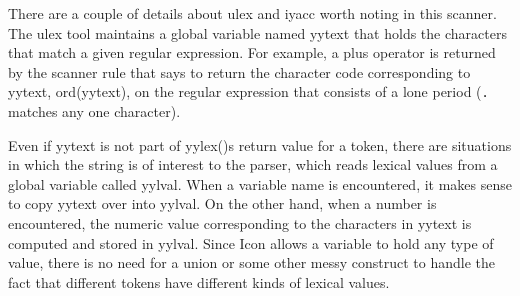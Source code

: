 
There are a couple of details about \textsf{ulex} and \textsf{iyacc}
worth noting in this scanner. The \textsf{ulex} tool maintains a global
variable named \textsf{yytext} that holds the characters that match a
given regular expression. For example, a plus operator is returned by
the scanner rule that says to return the character code corresponding
to \textsf{yytext}, \textsf{ord(yytext)}, on the regular expression
that consists of a lone period (\texttt{.} matches any one character).

Even if \textsf{yytext} is not part of
\textsf{yylex()}{\textquotesingle}s return value for a token, there are
situations in which the string is of interest to the parser, which
reads lexical values from a global variable called \textsf{yylval}.
When a variable name is encountered, it makes sense to copy
\textsf{yytext} over into \textsf{yylval}. On the other hand, when a
number is encountered, the numeric value corresponding to the
characters in \textsf{yytext} is computed and stored in
\textsf{yylval}. Since Icon allows a variable to hold any type of
value, there is no need for a union or some other messy construct to
handle the fact that different tokens have different kinds of lexical
values.


